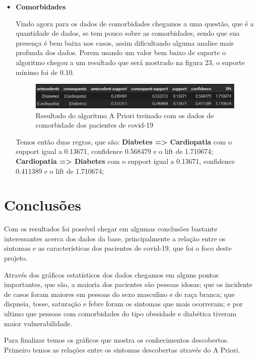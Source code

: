 \documentclass[tcc1]{uftex}
\begin{document}
\begin{itemize}
   \item\textbf{Comorbidades}
   
   Vindo agora para os dados de comorbidades chegamos a uma questão, que é a quantidade de dados, se tem pouco sobre as comorbidades, sendo que sua presença é bem baixa nos casos, assim dificultando alguma analise mais profunda dos dados. Porem usando um valor bem baixo de suporte o algoritmo chegou a um resultado que será mostrado na figura 23, o suporte mínimo foi de 0.10.
   
   \begin{figure}[!h]
    \centering
    \includegraphics[width=14cm]{resultado_apriori_comorbidade.png} %
    \caption{Resultado do algoritmo A Priori treinado com os dados de comorbidade dos pacientes de covid-19}
    \end{figure}
   
   Temos então duas regras, que são:
   \textbf{Diabetes => Cardiopatia} com o support igual a 0.13671, confidence 0.568479 e o lift de 1.710674;
    \textbf{Cardiopatia => Diabetes} com o support igual a 0.13671, confidence 0.411389 e o lift de 1.710674; 
   
 \end{itemize}

\chapter{Conclusões}
    
    Com os resultados foi possível chegar em algumas conclusões bastante interessantes acerca dos dados da base, principalmente a relação entre os sintomas e as características dos pacientes de covid-19, que foi o foco deste projeto.
    
    Através dos gráficos estatísticos dos dados chegamos em alguns pontos importantes, que são, a maioria dos pacientes são pessoas idosas; que os incidente de casos foram maiores em pessoas do sexo masculino e de raça branca; que dispneia, tosse, saturação e febre foram os sintomas que mais ocorreram; e por ultimo que pessoas com comorbidades do tipo obesidade e diabética tiveram maior vulnerabilidade.
    
    Para finalizar temos os gráficos que mostra os conhecimentos descobertos. Primeiro temos as relações entre os sintomas descobertas através do A Priori. 
\end{document}
